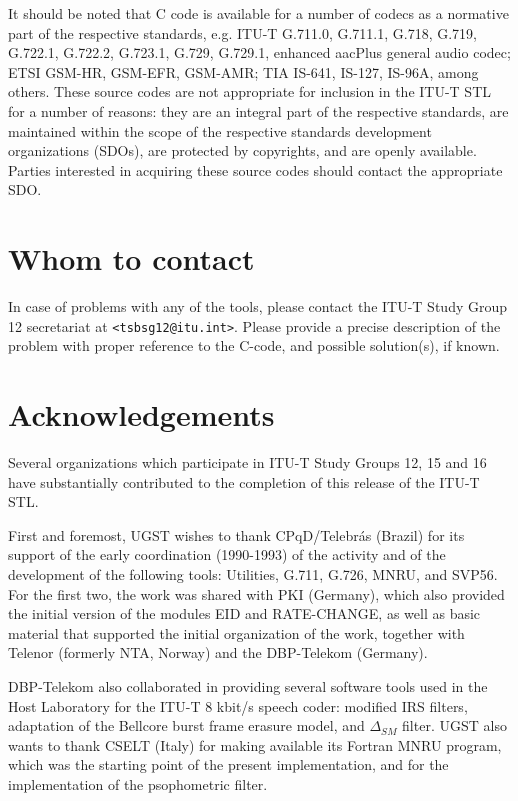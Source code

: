 It should be noted that C code is available for a number of codecs as
a normative part of the respective standards, e.g. ITU-T G.711.0,
G.711.1, G.718, G.719, G.722.1, G.722.2, G.723.1, G.729, G.729.1,
enhanced aacPlus general audio codec; ETSI GSM-HR, GSM-EFR, GSM-AMR;
TIA IS-641, IS-127, IS-96A, among others. These source codes are not
appropriate for inclusion in the ITU-T STL for a number of reasons:
they are an integral part of the respective standards, are maintained
within the scope of the respective standards development organizations
(SDOs), are protected by copyrights, and are openly available. Parties
interested in acquiring these source codes should contact the
appropriate SDO.

\section{Whom to contact}

In case of problems with any of the tools, please contact the ITU-T Study Group 12 secretariat at {\tt <tsbsg12@itu.int>}.
Please provide a precise description of the problem with proper reference to the C-code, and possible solution(s), if known.

\section{Acknowledgements}

Several organizations which participate in ITU-T Study Groups 12, 15 and 16 have substantially contributed to the completion of this release of the ITU-T STL.

First and foremost, UGST wishes to thank CPqD/Telebr\'as (Brazil) for its support of the early coordination (1990-1993) of the activity and of the development of the following tools: Utilities, G.711, G.726, MNRU, and SVP56.
For the first two, the work was shared with PKI (Germany), which also provided the initial version of the modules EID and RATE-CHANGE, as well as basic material that supported the initial organization of the work, together with Telenor (formerly NTA, Norway) and the DBP-Telekom (Germany).

DBP-Telekom also collaborated in providing several software tools used in the Host Laboratory for the ITU-T 8 kbit/s speech coder: modified IRS filters, adaptation of the Bellcore burst frame erasure model, and $\Delta_{SM}$ filter.
UGST also wants to thank CSELT (Italy) for making available its Fortran MNRU program, which was the starting point of the present implementation, and for the implementation of the psophometric filter.

